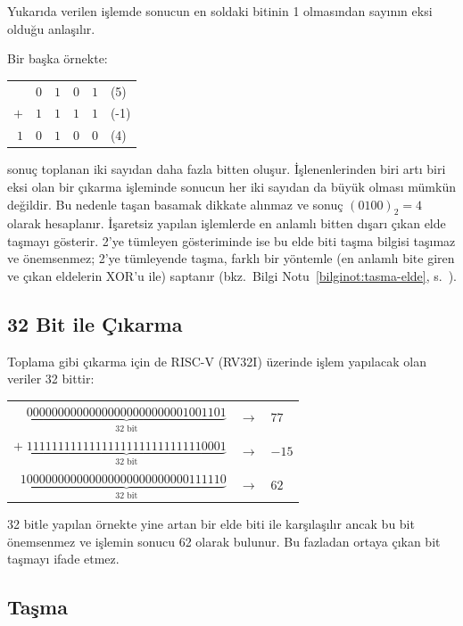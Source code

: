 Yukarıda verilen işlemde sonucun en soldaki bitinin 1 olmasından sayının eksi olduğu anlaşılır.

Bir başka örnekte:
\begin{center}
\begin{tabular}{r c c c c l}
  & $0$ & $1$ & $0$ & $1$ & (5)  \\
$+$ & $1$ & $1$ & $1$ & $1$ & (-1) \\
\hline
$1$ & $0$ & $1$ & $0$ & $0$ & (4) \\
\end{tabular}
\end{center}

sonuç toplanan iki sayıdan daha fazla bitten oluşur. İşlenenlerinden biri artı biri eksi olan bir çıkarma işleminde sonucun her iki sayıdan da büyük olması mümkün değildir. Bu nedenle taşan basamak dikkate alınmaz ve sonuç $(0100)_2 = 4$ olarak hesaplanır. İşaretsiz yapılan işlemlerde en anlamlı bitten dışarı çıkan elde taşmayı gösterir. 2'ye tümleyen gösteriminde ise bu elde biti taşma bilgisi taşımaz ve önemsenmez; 2'ye tümleyende taşma, farklı bir yöntemle (en anlamlı bite giren ve çıkan eldelerin XOR'u ile) saptanır (bkz.\ Bilgi Notu~\ref{bilginot:tasma-elde}, s.~\pageref{bilginot:tasma-elde}).

\subsection{32 Bit ile Çıkarma}

Toplama gibi çıkarma için de RISC-V (RV32I) üzerinde işlem yapılacak olan veriler 32 bittir:

\begin{center}
\small
\begin{tabular}{r c l}
$\underbrace{00000000000000000000000001001101}_{32 \text{ bit}}$ & $\rightarrow$ & $77$ \\
$+ \; \underbrace{11111111111111111111111111110001}_{32 \text{ bit}}$ & $\rightarrow$ & $-15$ \\
\hline
$1\underbrace{00000000000000000000000000111110}_{32 \text{ bit}}$ & $\rightarrow$ & $62$ \\
\end{tabular}
\end{center}

32 bitle yapılan örnekte yine artan bir elde biti ile karşılaşılır ancak bu bit önemsenmez ve işlemin sonucu 62 olarak bulunur. Bu fazladan ortaya çıkan bit taşmayı ifade etmez.

\subsection{Taşma}
\label{sec:tasma}

